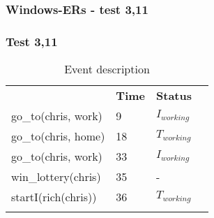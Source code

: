 \documentclass[8pt]{beamer}
\begin{document}
\begin{frame}
    \frametitle{Windows-ERs - test 3,11}
    \subsubsection{Test 3,11}
    \small
    \begin{minipage}{0.48\linewidth}

        \begin{table}[t!]
            \caption{Event description}
            \begin{center}

                \begin{tabular}{llll}
                    \hline\noalign{\smallskip}
                    \multicolumn{1}{l}{\textbf{Event}} & \multicolumn{1}{c}{\textbf{Time}} & \multicolumn{1}{c}{\textbf{Status}}  \\
                    go\_to(chris, work)& 9 & $I_{working}$\\
                    go\_to(chris, home)& 18 &$T_{working}$\\
                    go\_to(chris, work)& 33&$I_{working}$\\
                    win\_lottery(chris)& 35 & -\\
                    startI(rich(chris))& 36 &$T_{working}$\\
                    \noalign{\smallskip}
                    \hline
                \end{tabular}
            \end{center}
        \end{table}
    \end{minipage}
    \begin{minipage}{0.48\linewidth}


\end{minipage}
\end{frame}
\end{document}
